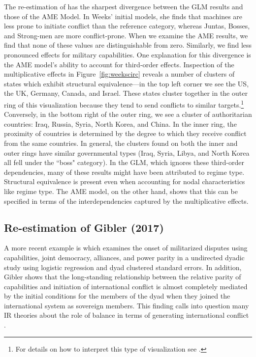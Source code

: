 The re-estimation of \citet{weeks:2012} has the sharpest divergence between the GLM results and those of the AME Model. In Weeks' initial models,  she finds that machines are less prone to initiate conflict than the reference category, whereas Juntas, Bosses, and Strong-men are more conflict-prone. When we examine the AME results, we find that none of these values are distinguishable from zero. Similarly, we find less pronounced effects for military capabilities. One explanation for this divergence is the AME model's ability to account for third-order effects. Inspection of the multiplicative effects in Figure~\ref{fig:weekscirc} reveals a number of clusters of states which exhibit structural equivalence---in the top left corner we see the US, the UK, Germany, Canada, and Israel. These states cluster together in the outer ring of this visualization because they tend to send conflicts to similar targets.\footnote{For details on how to interpret this type of visualization see \citet{minhas:etal:2016:arxiv}.} Conversely, in the bottom right of the outer ring, we see a cluster of authoritarian countries: Iraq, Russia, Syria, North Korea, and China. In the inner ring, the proximity of countries is determined by the degree to which they receive conflict from the same countries. In general, the clusters found on both the inner and outer rings have similar governmental types (Iraq, Syria, Libya, and North Korea all fell under the ``boss" category). In the GLM, which ignores these third-order dependencies, many of these results might have been attributed to regime type. Structural equivalence is present even when accounting for nodal characteristics like regime type.  The AME model, on the other hand, shows that this can be specified in terms of the interdependencies captured by the multiplicative effects. 

\subsection{Re-estimation of Gibler (2017)}

A more recent example is \citet{gibler:2017} which examines the onset of militarized disputes using capabilities, joint democracy, alliances, and power parity in a undirected dyadic study using logistic regression and dyad clustered standard errors. In addition, Gibler shows that the long-standing relationship between the relative parity of capabilities and initiation of international conflict is almost completely mediated by the initial conditions for the members of the dyad when they joined the international system as sovereign members. This finding calls into question many IR theories about the role of balance in terms of generating international conflict \citep{organski:1958}.


